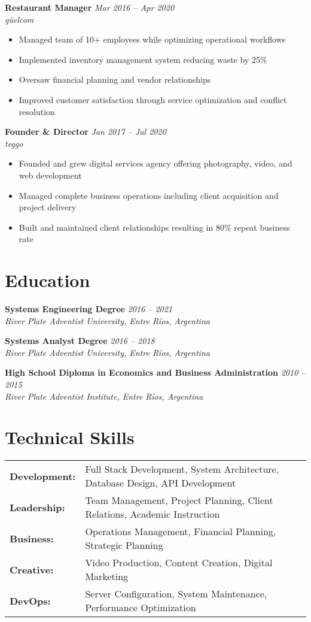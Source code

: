 \documentclass[11pt,a4paper]{article}
\begin{document}
\noindent\textbf{Restaurant Manager} \hfill \textit{Mar 2016 -- Apr 2020}\\
\textit{güelcom}
\begin{itemize}[leftmargin=*]
\item Managed team of 10+ employees while optimizing operational workflows
\item Implemented inventory management system reducing waste by 25\%
\item Oversaw financial planning and vendor relationships
\item Improved customer satisfaction through service optimization and conflict resolution
\end{itemize}

\noindent\textbf{Founder \& Director} \hfill \textit{Jan 2017 -- Jul 2020}\\
\textit{teggo}
\begin{itemize}[leftmargin=*]
\item Founded and grew digital services agency offering photography, video, and web development
\item Managed complete business operations including client acquisition and project delivery
\item Built and maintained client relationships resulting in 80\% repeat business rate
\end{itemize}

\section{Education}
\noindent\textbf{Systems Engineering Degree} \hfill \textit{2016 -- 2021}\\
\textit{River Plate Adventist University, Entre Ríos, Argentina}

\noindent\textbf{Systems Analyst Degree} \hfill \textit{2016 -- 2018}\\
\textit{River Plate Adventist University, Entre Ríos, Argentina}

\noindent\textbf{High School Diploma in Economics and Business Administration} \hfill \textit{2010 -- 2015}\\
\textit{River Plate Adventist Institute, Entre Ríos, Argentina}

\section{Technical Skills}
\begin{tabular}{l l}
\textbf{Development:} & Full Stack Development, System Architecture, Database Design, API Development \\
\textbf{Leadership:} & Team Management, Project Planning, Client Relations, Academic Instruction \\
\textbf{Business:} & Operations Management, Financial Planning, Strategic Planning \\
\textbf{Creative:} & Video Production, Content Creation, Digital Marketing \\
\textbf{DevOps:} & Server Configuration, System Maintenance, Performance Optimization

\end{tabular}
\end{document}
